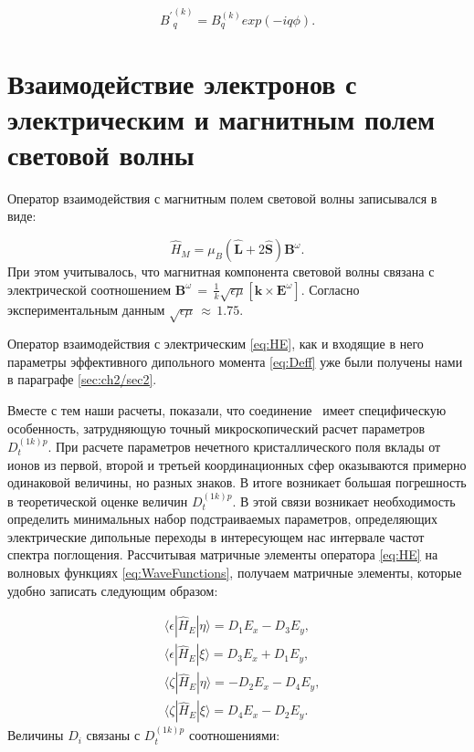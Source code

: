 \begin{equation}
	\label{eq:BkqLocal}
	{B^\prime}_q^{(k)} = B_q^{(k)} exp(-iq\phi).
\end{equation}


\section{Взаимодействие электронов с электрическим и магнитным полем световой волны}\label{sec:ch3/sect2}

Оператор взаимодействия с магнитным полем световой волны записывался в виде:

\begin{equation}
	\label{eq:HM}
	\hat{H}_M = \mu_B (\hat{\bm{L}} + 2\hat{\bm{S}}) \bm{B}^{\omega}.
\end{equation}
При этом учитывалось, что магнитная компонента световой волны связана с электрической соотношением $\bm{B}^\omega \, {=} \, \frac{1}{k} \sqrt{\epsilon\mu} [\bm{k} \times \bm{E}^\omega]$. Согласно экспериментальным данным \cite{Pisarev2011} $\sqrt{\epsilon\mu} \, {\approx} \, 1.75$.

Оператор взаимодействия с электрическим \cref{eq:HE}, как и входящие в него параметры эффективного дипольного момента \cref{eq:Deff} уже были получены нами в параграфе \cref{sec:ch2/sec2}. 

Вместе с тем наши расчеты, показали, что соединение \cbo\ имеет специфическую особенность, затрудняющую точный микроскопический расчет параметров $D_t^{(1k)p}$. При расчете параметров нечетного кристаллического поля вклады от ионов из первой, второй и третьей координационных сфер оказываются примерно одинаковой величины, но разных знаков. В итоге возникает большая погрешность в теоретической оценке величин $D_t^{(1k)p}$. В этой связи возникает необходимость определить минимальных набор подстраиваемых параметров, определяющих электрические дипольные переходы в интересующем нас интервале частот спектра поглощения. Рассчитывая матричные элементы оператора \cref{eq:HE} на волновых функциях \cref{eq:WaveFunctions}, получаем матричные элементы, которые удобно записать следующим образом:

\begin{equation}
	\label{eq:HeMatrixElements}
	\begin{aligned}
		& \langle \epsilon | \hat{H}_E | \eta \rangle = D_1 E_x - D_3 E_y, \\
		& \langle \epsilon | \hat{H}_E | \xi \rangle = D_3 E_x + D_1 E_y, \\
		& \langle \zeta | \hat{H}_E | \eta \rangle = - D_2 E_x - D_4 E_y, \\
		& \langle \zeta | \hat{H}_E | \xi \rangle = D_4 E_x - D_2 E_y.
	\end{aligned}
\end{equation}
Величины $D_i$ связаны с $D_t^{(1k)p}$ соотношениями:


